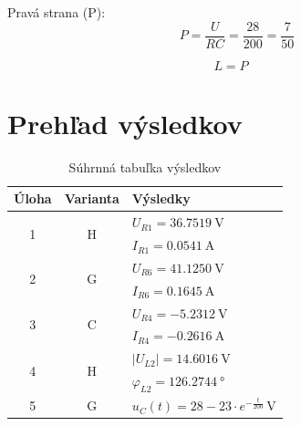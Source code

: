 \documentclass[12pt,a4paper]{article}
\begin{document}
Pravá strana (P):
$$ P = \frac{U}{RC} = \frac{28}{200} = \frac{7}{50} $$

$$ L = P \quad $$

\newpage

\section*{Prehľad výsledkov}

\begin{table}[h!]
    \centering
    \renewcommand{\arraystretch}{1.5}
    \setlength{\tabcolsep}{12pt}
    \begin{tabular}{|c|c|l|}
        \hline
        \textbf{Úloha}     & \textbf{Varianta}  & \textbf{Výsledky}                                         \\ \hline
        \multirow{2}{*}{1} & \multirow{2}{*}{H} & $U_{R1} = \qty{36,7519}{\volt}$                           \\
                           &                    & $I_{R1} = \qty{0,0541}{\ampere}$                          \\ \hline
        \multirow{2}{*}{2} & \multirow{2}{*}{G} & $U_{R6} = \qty{41,1250}{\volt}$                           \\
                           &                    & $I_{R6} = \qty{0,1645}{\ampere}$                          \\ \hline
        \multirow{2}{*}{3} & \multirow{2}{*}{C} & $U_{R4} = \qty{-5,2312}{\volt}$                           \\
                           &                    & $I_{R4} = \qty{-0,2616}{\ampere}$                         \\ \hline
        \multirow{2}{*}{4} & \multirow{2}{*}{H} & $|U_{L2}| = \qty{14,6016}{\volt}$                         \\
                           &                    & $\varphi_{L2} = \qty{126,2744}{\degree}$                  \\ \hline
        5                  & G                  & $u_C(t) = 28 - 23 \cdot e^{-\frac{t}{200}} \, \si{\volt}$ \\ \hline
    \end{tabular}
    \caption*{Súhrnná tabuľka výsledkov}
\end{table}
\end{document}

